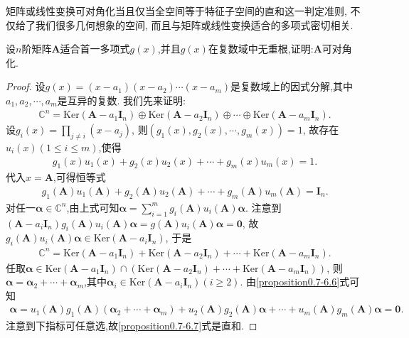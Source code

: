 \documentclass[../../main.tex]{subfiles}
\begin{document}
矩阵或线性变换可对角化当且仅当全空间等于特征子空间的直和这一判定准则, 不仅给了我们很多几何想象的空间, 而且与矩阵或线性变换适合的多项式密切相关.

\begin{proposition}\label{proposition:适合的多项式无重根则可对角化}
设\(n\)阶矩阵\(\boldsymbol{A}\)适合首一多项式\(g(x)\),并且\(g(x)\)在复数域中无重根,证明:\(\boldsymbol{A}\)可对角化.
\end{proposition}
\begin{proof}
设\(g(x) = (x - a_1)(x - a_2)\cdots(x - a_m)\)是复数域上的因式分解,其中\(a_1,a_2,\cdots,a_m\)是互异的复数. 我们先来证明:
\begin{align}
\mathbb{C}^n = \mathrm{Ker}(\boldsymbol{A} - a_1\boldsymbol{I}_n)\oplus \mathrm{Ker}(\boldsymbol{A} - a_2\boldsymbol{I}_n)\oplus\cdots\oplus \mathrm{Ker}(\boldsymbol{A} - a_m\boldsymbol{I}_n). \label{proposition0.7-6.5}
\end{align}
设\(g_i(x) = \prod_{j\neq i}(x - a_j)\), 则\((g_1(x),g_2(x),\cdots,g_m(x)) = 1\), 故存在\(u_i(x)(1\leq i\leq m)\),使得
\begin{align*}
g_1(x)u_1(x) + g_2(x)u_2(x) + \cdots + g_m(x)u_m(x) = 1.
\end{align*}
代入\(x = \boldsymbol{A}\),可得恒等式
\begin{align}
g_1(\boldsymbol{A})u_1(\boldsymbol{A}) + g_2(\boldsymbol{A})u_2(\boldsymbol{A}) + \cdots + g_m(\boldsymbol{A})u_m(\boldsymbol{A}) = \boldsymbol{I}_n. \label{proposition0.7-6.6}
\end{align}
对任一\(\boldsymbol{\alpha}\in \mathbb{C}^n\),由上式可知\(\boldsymbol{\alpha} = \sum_{i = 1}^{m}g_i(\boldsymbol{A})u_i(\boldsymbol{A})\boldsymbol{\alpha}\). 注意到\((\boldsymbol{A}-a_i\boldsymbol{I}_n)g_i(\boldsymbol{A})u_i(\boldsymbol{A})\boldsymbol{\alpha} = g(\boldsymbol{A})u_i(\boldsymbol{A})\boldsymbol{\alpha} = \boldsymbol{0}\), 故\(g_i(\boldsymbol{A})u_i(\boldsymbol{A})\boldsymbol{\alpha}\in \mathrm{Ker}(\boldsymbol{A} - a_i\boldsymbol{I}_n)\), 于是
\begin{align}
\mathbb{C}^n = \mathrm{Ker}(\boldsymbol{A} - a_1\boldsymbol{I}_n) + \mathrm{Ker}(\boldsymbol{A} - a_2\boldsymbol{I}_n) + \cdots + \mathrm{Ker}(\boldsymbol{A} - a_m\boldsymbol{I}_n). \label{proposition0.7-6.7}
\end{align}
任取\(\boldsymbol{\alpha}\in \mathrm{Ker}(\boldsymbol{A}-a_1\boldsymbol{I}_n)\cap(\mathrm{Ker}(\boldsymbol{A}-a_2\boldsymbol{I}_n)+\cdots+\mathrm{Ker}(\boldsymbol{A}-a_m\boldsymbol{I}_n))\), 则\(\boldsymbol{\alpha} = \boldsymbol{\alpha}_2+\cdots+\boldsymbol{\alpha}_m\),其中\(\boldsymbol{\alpha}_i\in \mathrm{Ker}(\boldsymbol{A} - a_i\boldsymbol{I}_n)(i\geq 2)\). 由\eqref{proposition0.7-6.6}式可知
\begin{align*}
\boldsymbol{\alpha} = u_1(\boldsymbol{A})g_1(\boldsymbol{A})(\boldsymbol{\alpha}_2 + \cdots + \boldsymbol{\alpha}_m) + u_2(\boldsymbol{A})g_2(\boldsymbol{A})\boldsymbol{\alpha} + \cdots + u_m(\boldsymbol{A})g_m(\boldsymbol{A})\boldsymbol{\alpha} = \boldsymbol{0}.
\end{align*}
注意到下指标可任意选,故\eqref{proposition0.7-6.7}式是直和.


\end{proof}
\end{document}
